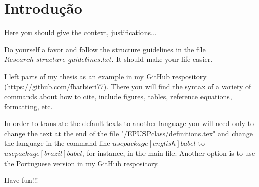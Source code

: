 \chapter{Introdu\c c\~ ao} \label{chap:intro}
\pagestyle{fancyplain}


Here you should give the context, justifications...

Do yourself a favor and follow the structure guidelines in the file $Research\_structure\_guidelines.txt$.
It should make your life easier.

I left parts of my thesis as an example in my GitHub respository (\url{https://github.com/fbarbieri77}).
There you will find the syntax of a variety of commands about how to cite, include figures, tables, reference equations, formatting, etc.

In order to translate the default texts to another language you will need only to change the text at the end of the file "/EPUSPclass/definitions.tex" and change the language in the command line $usepackage[english]{babel}$ to $usepackage[brazil]{babel}$, for instance, in the main file.
Another option is to use the Portuguese version in my GitHub respository.

Have fun!!!

